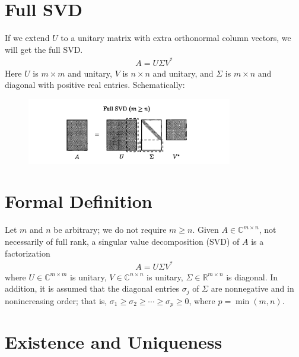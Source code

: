 \section{Full SVD}
If we extend $U$ to a unitary matrix with extra orthonormal column vectors, we will get the full SVD. 
\begin{align*}
    A=U \Sigma V^*
\end{align*}
Here $U$ is $m \times m$ and unitary, $V$ is $n \times n$ and unitary, and $\Sigma$ is $m \times n$ and diagonal with positive real entries. Schematically:
\begin{figure}[H]
    \centering
    \includegraphics[width=0.8\textwidth]{figures/4-3.png}
\end{figure}

\section{Formal Definition} 
Let $m$ and $n$ be arbitrary; we do not require $m \geq n$. Given $A \in \mathbb{C}^{m \times n}$, not necessarily of full rank, a singular value decomposition (SVD) of $A$ is a factorization
\begin{align}
    \label{eq: SVD}
A=U \Sigma V^*
\end{align}
where
$U \in \mathbb{C}^{m \times m}$ is unitary,
$V \in \mathbb{C}^{n \times n}$ is unitary,
$\Sigma \in \mathbb{R}^{m \times n}$ is diagonal.
In addition, it is assumed that the diagonal entries $\sigma_j$ of $\Sigma$ are nonnegative and in nonincreasing order; that is, $\sigma_1 \geq \sigma_2 \geq \cdots \geq \sigma_p \geq 0$, where $p=\min (m, n)$.

\section{Existence and Uniqueness} 

